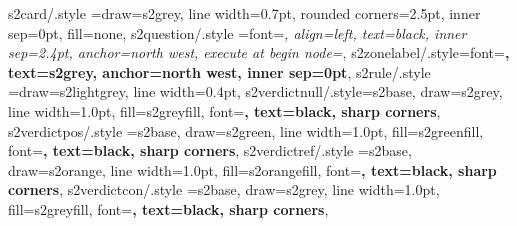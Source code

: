 {  %
  s2card/.style     ={draw=s2grey, line width=0.7pt, rounded corners=2.5pt,
                      inner sep=0pt, fill=none},
  s2question/.style ={font=\scriptsize\itshape, align=left, text=black,
                      inner sep=2.4pt, anchor=north west,
                      execute at begin node={}},
  s2zonelabel/.style={font=\tiny\bfseries, text=s2grey, anchor=north west,
                      inner sep=0pt},
  s2rule/.style     ={draw=s2lightgrey, line width=0.4pt},
  s2verdictnull/.style={s2base, draw=s2grey, line width=1.0pt, fill=s2greyfill,
                      font=\scriptsize\bfseries, text=black, sharp corners},
  s2verdictpos/.style ={s2base, draw=s2green, line width=1.0pt, fill=s2greenfill,
                      font=\scriptsize\bfseries, text=black, sharp corners},
  s2verdictref/.style ={s2base, draw=s2orange, line width=1.0pt, fill=s2orangefill,
                      font=\scriptsize\bfseries, text=black, sharp corners},
  s2verdictcon/.style ={s2base, draw=s2grey, line width=1.0pt, fill=s2greyfill,
                      font=\scriptsize\bfseries, text=black, sharp corners},
}

\newcommand{\scodscope}[1]{{\tiny\sffamily\bfseries\textcolor{s2grey}{[#1]}}}
\newcommand{\scodgen}{\scodscope{scope:\,generator}}
\newcommand{\scodsig}{\scodscope{scope:\,signal+data}}
\newcommand{\scodind}{\scodscope{scope:\,method-independent}}
\newcommand{\scodseeds}[1]{{\tiny\textcolor{s2grey}{$n{=}#1$ seeds}}}
\newcommand{\scodsingle}{{\tiny\bfseries\textcolor{s2orange}{single seed}}}
\newcommand{\scodSa}{$S_\alpha$}
\newcommand{\scodMAE}{\textsc{mae}}
\newcommand{\scodsigmahat}{$\hat{\sigma}$}
\newcommand{\scodbar}{$2\hat{\sigma}$}
\newcommand{\scodrho}{$\rho$}
\newcommand{\scoddelta}[1]{$\Delta(#1)$}
\newcommand{\scodwithinnoise}{\textsc{within noise}}

